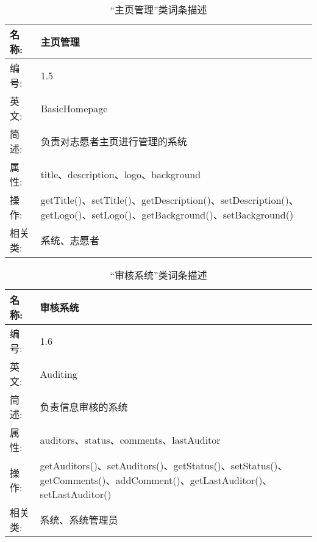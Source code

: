 \begin{table}[H]  
\caption{“主页管理”类词条描述}  
\begin{center}  
    \begin{tabular}{l p{11cm}} 
        \hline
        \quad 名称:  &  主页管理 \\
        \hline
        \quad 编号:  & 1.5 \\
        \hline
        \quad 英文:  &  BasicHomepage \\
        \hline
        \quad 简述:  & 负责对志愿者主页进行管理的系统 \\
        \hline
        \quad 属性:  & title、description、logo、background\\
        \hline
        \quad 操作:  & getTitle()、setTitle()、getDescription()、setDescription()、getLogo()、setLogo()、getBackground()、setBackground()\\
        \hline
        \quad 相关类:  & 系统、志愿者 \\
        \hline
    \end{tabular}
\end{center}
\end{table}

\begin{table}[H]  
\caption{“审核系统”类词条描述}  
\begin{center}  
    \begin{tabular}{l p{11cm}} 
        \hline
        \quad 名称:  &  审核系统 \\
        \hline
        \quad 编号:  & 1.6 \\
        \hline
        \quad 英文:  &  Auditing \\
        \hline
        \quad 简述:  & 负责信息审核的系统 \\
        \hline
        \quad 属性:  & auditors、status、comments、lastAuditor\\
        \hline
        \quad 操作:  & getAuditors()、setAuditors()、getStatus()、setStatus()、getComments()、addComment()、getLastAuditor()、setLastAuditor()
\\
        \hline
        \quad 相关类:  & 系统、系统管理员 \\
        \hline
    \end{tabular}
\end{center}
\end{table}